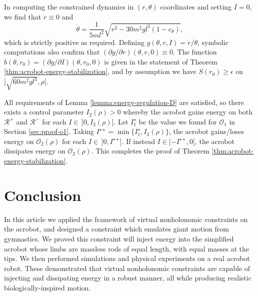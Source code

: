 \documentclass[journal,twoside,web, onecolumn, draftcls]{ieeecolor}
\begin{document}
In computing the constrained dynamics in
\((r,\theta)\) coordinates and setting \(I = 0\), 
we find that \(\dot{r} \equiv 0\) and
\[
\dot{\theta} = \frac{1}{5ml^2} \sqrt{r^2 - 30m^2gl^3(1-c_\theta)}
,
\]
which is strictly positive as required.
Defining \(g(\theta,r,I) = \dot{r}/\dot{\theta}\), symbolic computations
also confirm that \((\partial g/\partial r)(\theta,r,0) \equiv 0\).
The function \(b(\theta,r_0) = (\partial g/\partial I)(\theta,r_0,0)\) is given
in the statement of Theorem \ref{thm:acrobot-energy-stabilization}, and by
assumption we have \(S(r_0) \geq \epsilon\) on
\(]\sqrt{60m^2gl^3},\rho[\).

All requirements of Lemma \ref{lemma:energy-regulation-D} are satisfied,
so there exists a control parameter \(I_2(\rho) > 0\) whereby the acrobot
gains energy on both \(\mathcal{R}^+\) and \(\mathcal{R}^-\) for
each \(I \in \, ]0,I_2(\rho)]\).
Let \(I_1^\star\) be the value we found for \(\mathcal{O}_1\) in 
Section \ref{sec:proof-o1}.
Taking \(I^{\star\star} = \min \{I_1^\star, I_2(\rho)\}\),
the acrobot gains/loses energy on \(\mathcal{O}_2(\rho)\)
for each \(I \in \,]0, I^{\star\star}]\).
If instead \(I \in [-I^{\star\star},0[\), the acrobot dissipates energy on
\(\mathcal{O}_2(\rho)\).
This completes the proof of Theorem \ref{thm:acrobot-energy-stabilization}.

\section{Conclusion}\label{sec:conclusion}

In this article we applied the framework of virtual nonholonomic constraints
on the acrobot, and designed a constraint which emulates giant motion from
gymnastics.
We proved this constraint will inject energy into the simplified acrobot whose
limbs are massless rods of equal length, with equal masses at the tips.
We then performed simulations and physical experiments on a real acrobot robot.
These demonstrated that virtual nonholonomic constraints are capable of
injecting and dissipating energy in a robust manner, all while producing
realistic biologically-inspired motion.


\end{document}
